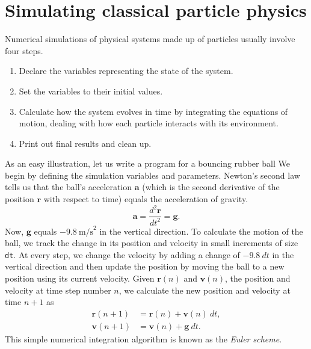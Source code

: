 \section*{\label{basic_simulation}Simulating classical particle physics}
\label{basic_simulation}

Numerical simulations of physical systems made up of particles usually involve
four steps.
\begin{enumerate}
  \item Declare the variables representing the state of the system.
  \item Set the variables to their initial values.
  \item Calculate how the system evolves in time by integrating the
        equations of motion, dealing with how each particle interacts with its
        environment.
  \item Print out final results and clean up.
\end{enumerate}

As an easy illustration, let us write a program for a bouncing rubber ball We 
begin by defining the simulation variables and parameters. Newton's second law 
tells us that the ball's acceleration $\mathbf{a}$ (which is the second 
derivative of the position $\mathbf{r}$ with respect to time) equals the 
acceleration of gravity.
\begin{equation*}
  \mathbf{a} = \frac{d^2\mathbf{r}}{dt^2} = \mathbf{g}.
\end{equation*}
Now, $\mathbf{g}$ equals $-9.8\ \mathrm{m/s}^2$ in the vertical direction. To
calculate the motion of the ball, we track the change in its position and
velocity in small increments of size \texttt{dt}. At every step, we change the
velocity by adding a change of $-9.8\ dt$ in the vertical direction and then
update the position by moving the ball to a new position using its current
velocity. Given $\mathbf{r}(n)$ and $\mathbf{v}(n)$, the position and velocity
at time step number $n$, we calculate the new position and velocity at time
$n + 1$ as
\begin{align*}
  \mathbf{r}(n + 1) & = \mathbf{r}(n) + \mathbf{v}(n)\ dt, \\
  \mathbf{v}(n + 1) & = \mathbf{v}(n) + \mathbf{g}\ dt.
\end{align*}
This simple numerical integration algorithm is known as the \textit{Euler
scheme}.

